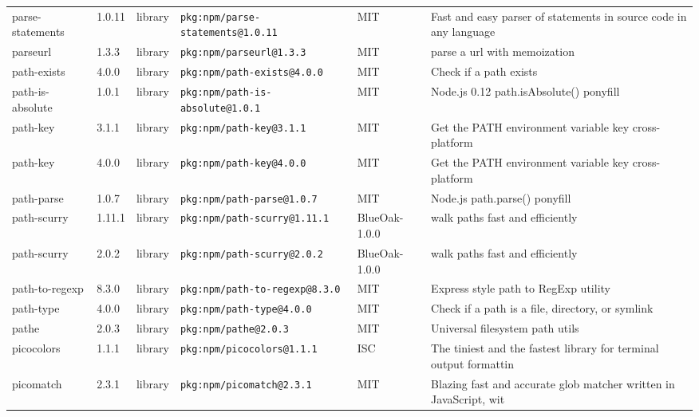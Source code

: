 \documentclass[11pt,a4paper]{article}
\begin{document}
\begin{longtable}{|p{4cm}|p{2cm}|p{1.6cm}|p{5cm}|p{1.5cm}|p{3.5cm}|}
\raggedright parse-statements & 1.0.11 & library & \small\texttt{pkg:npm/parse-statements@1.0.11} & MIT & \small Fast and easy parser of statements in source code in any language \\
\raggedright parseurl & 1.3.3 & library & \small\texttt{pkg:npm/parseurl@1.3.3} & MIT & \small parse a url with memoization \\
\raggedright path-exists & 4.0.0 & library & \small\texttt{pkg:npm/path-exists@4.0.0} & MIT & \small Check if a path exists \\
\raggedright path-is-absolute & 1.0.1 & library & \small\texttt{pkg:npm/path-is-absolute@1.0.1} & MIT & \small Node.js 0.12 path.isAbsolute() ponyfill \\
\raggedright path-key & 3.1.1 & library & \small\texttt{pkg:npm/path-key@3.1.1} & MIT & \small Get the PATH environment variable key cross-platform \\
\raggedright path-key & 4.0.0 & library & \small\texttt{pkg:npm/path-key@4.0.0} & MIT & \small Get the PATH environment variable key cross-platform \\
\raggedright path-parse & 1.0.7 & library & \small\texttt{pkg:npm/path-parse@1.0.7} & MIT & \small Node.js path.parse() ponyfill \\
\raggedright path-scurry & 1.11.1 & library & \small\texttt{pkg:npm/path-scurry@1.11.1} & BlueOak-1.0.0 & \small walk paths fast and efficiently \\
\raggedright path-scurry & 2.0.2 & library & \small\texttt{pkg:npm/path-scurry@2.0.2} & BlueOak-1.0.0 & \small walk paths fast and efficiently \\
\raggedright path-to-regexp & 8.3.0 & library & \small\texttt{pkg:npm/path-to-regexp@8.3.0} & MIT & \small Express style path to RegExp utility \\
\raggedright path-type & 4.0.0 & library & \small\texttt{pkg:npm/path-type@4.0.0} & MIT & \small Check if a path is a file, directory, or symlink \\
\raggedright pathe & 2.0.3 & library & \small\texttt{pkg:npm/pathe@2.0.3} & MIT & \small Universal filesystem path utils \\
\raggedright picocolors & 1.1.1 & library & \small\texttt{pkg:npm/picocolors@1.1.1} & ISC & \small The tiniest and the fastest library for terminal output formattin \\
\raggedright picomatch & 2.3.1 & library & \small\texttt{pkg:npm/picomatch@2.3.1} & MIT & \small Blazing fast and accurate glob matcher written in JavaScript, wit \\

\end{longtable}
\end{document}

